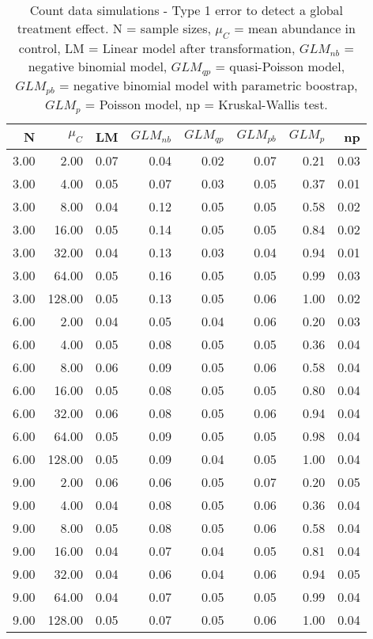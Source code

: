 \begin{table}[H]
\centering
\caption{Count data simulations - Type 1 error to detect a global treatment effect. N = sample sizes, 
             $\mu_C$ = mean abundance in control, LM = Linear model after transformation, 
             $GLM_{nb}$ = negative binomial model, $GLM_{qp}$ = quasi-Poisson model, 
             $GLM_{pb}$ = negative binomial model with parametric boostrap, 
             $GLM_{p}$ = Poisson model, np = Kruskal-Wallis test.} 
\label{tab:t1_glob_c}
{\footnotesize
\begin{tabular}{rrrrrrrr}
  \hline
N & $\mu_C$ & LM & $GLM_{nb}$ & $GLM_{qp}$ & $GLM_{pb}$ & $GLM_{p}$ & np \\ 
  \hline
3.00 & 2.00 & 0.07 & 0.04 & 0.02 & 0.07 & 0.21 & 0.03 \\ 
  3.00 & 4.00 & 0.05 & 0.07 & 0.03 & 0.05 & 0.37 & 0.01 \\ 
  3.00 & 8.00 & 0.04 & 0.12 & 0.05 & 0.05 & 0.58 & 0.02 \\ 
  3.00 & 16.00 & 0.05 & 0.14 & 0.05 & 0.05 & 0.84 & 0.02 \\ 
  3.00 & 32.00 & 0.04 & 0.13 & 0.03 & 0.04 & 0.94 & 0.01 \\ 
  3.00 & 64.00 & 0.05 & 0.16 & 0.05 & 0.05 & 0.99 & 0.03 \\ 
  3.00 & 128.00 & 0.05 & 0.13 & 0.05 & 0.06 & 1.00 & 0.02 \\ 
  6.00 & 2.00 & 0.04 & 0.05 & 0.04 & 0.06 & 0.20 & 0.03 \\ 
  6.00 & 4.00 & 0.05 & 0.08 & 0.05 & 0.05 & 0.36 & 0.04 \\ 
  6.00 & 8.00 & 0.06 & 0.09 & 0.05 & 0.06 & 0.58 & 0.04 \\ 
  6.00 & 16.00 & 0.05 & 0.08 & 0.05 & 0.05 & 0.80 & 0.04 \\ 
  6.00 & 32.00 & 0.06 & 0.08 & 0.05 & 0.06 & 0.94 & 0.04 \\ 
  6.00 & 64.00 & 0.05 & 0.09 & 0.05 & 0.05 & 0.98 & 0.04 \\ 
  6.00 & 128.00 & 0.05 & 0.09 & 0.04 & 0.05 & 1.00 & 0.04 \\ 
  9.00 & 2.00 & 0.06 & 0.06 & 0.05 & 0.07 & 0.20 & 0.05 \\ 
  9.00 & 4.00 & 0.04 & 0.08 & 0.05 & 0.06 & 0.36 & 0.04 \\ 
  9.00 & 8.00 & 0.05 & 0.08 & 0.05 & 0.06 & 0.58 & 0.04 \\ 
  9.00 & 16.00 & 0.04 & 0.07 & 0.04 & 0.05 & 0.81 & 0.04 \\ 
  9.00 & 32.00 & 0.04 & 0.06 & 0.04 & 0.06 & 0.94 & 0.05 \\ 
  9.00 & 64.00 & 0.04 & 0.07 & 0.05 & 0.05 & 0.99 & 0.04 \\ 
  9.00 & 128.00 & 0.05 & 0.07 & 0.05 & 0.06 & 1.00 & 0.04 \\ 
   \hline
\end{tabular}
}
\end{table}
